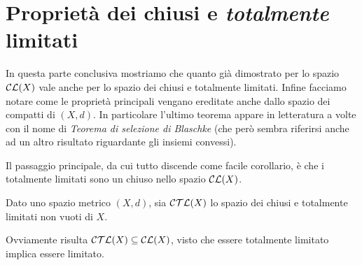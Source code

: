 \section{Proprietà dei chiusi e \emph{totalmente} limitati}
In questa parte conclusiva mostriamo che quanto già dimostrato per lo spazio $\mathcal{CL}(X)$ vale anche per lo spazio dei chiusi e totalmente limitati. Infine facciamo notare come le proprietà principali vengano ereditate anche dallo spazio dei compatti di $(X,d)$. In particolare l'ultimo teorema appare in letteratura a volte con il nome di \emph{Teorema di selezione di Blaschke} (che però sembra riferirsi anche ad un altro risultato riguardante gli insiemi convessi).

Il passaggio principale, da cui tutto discende come facile corollario, è che i totalmente limitati sono un chiuso nello spazio $\mathcal{CL}(X)$.

\begin{definition}
	Dato uno spazio metrico $(X,d)$, sia $\mathcal{CTL}(X)$ lo spazio dei chiusi e totalmente limitati non vuoti di $X$.
\end{definition}
\begin{remark}\label{SottoinsiemeCTL}
	Ovviamente risulta $\mathcal{CTL}(X)\subseteq \mathcal{CL}(X)$, visto che essere totalmente limitato implica essere limitato.
\end{remark}

